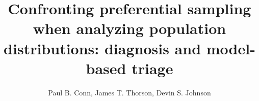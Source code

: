 \documentclass[times,mee,doublespace,]{besauth2}
\begin{document}


\title{Confronting preferential sampling when analyzing population distributions: diagnosis and model-based triage \footnotemark[2]}

\author{Paul B. Conn\corrauth, James T. Thorson, Devin S. Johnson}


\address{Marine Mammal Laboratory, Alaska Fisheries Science Center, NOAA, National Marine Fisheries Service, 7600 Sand Point Way NE, Seattle, WA 98115 USA;  Fisheries Resource Assessment and Monitoring Division (FRAM), Northwest Fisheries Science Center, NOAA, National Marine Fisheries Service,
2725 Montlake Boulevard E, Seattle, WA 98112, USA}

\end{document}
